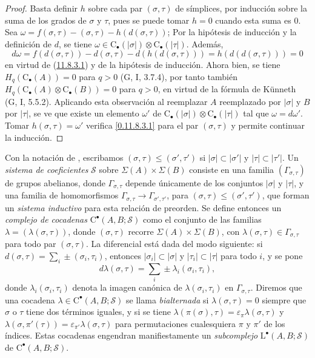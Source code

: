 \begin{proof}
Basta definir $h$ sobre cada par $(\sigma,\tau)$ de símplices, por
inducción sobre la suma de los grados de $\sigma$ y $\tau$, pues se puede tomar $h=0$ cuando esta suma es $0$. Sea
$\omega=f(\sigma,\tau)-(\sigma,\tau)-h(d(\sigma,\tau))$;
Por la hipótesis de inducción y la definición de $d$, se tiene
$\omega\in\mathrm C_\bullet(|\sigma|)\otimes\mathrm C_\bullet(|\tau|)$.
Además,
\[
d\omega=f(d(\sigma,\tau))-d(\sigma,\tau)-d(h(d(\sigma,\tau)))
=h(d(d(\sigma,\tau)))=0
\]
en virtud de (\hyperref[0.11.8.3.1-fr]{11.8.3.1}) y de la hipótesis de inducción. Ahora bien, se tiene $H_q(\mathrm C_\bullet(A))=0$ para $q>0$ (G, I, 3.7.4), por tanto también $H_q(\mathrm C_\bullet(A)\otimes\mathrm C_\bullet(B))=0$ para $q>0$, en virtud de la fórmula de Künneth (G, I, 5.5.2). Aplicando esta observación al reemplazar $A$ reemplazado por $|\sigma|$ y $B$ por
$|\tau|$, se ve que existe un elemento $\omega'$ de $\mathrm C_\bullet(|\sigma|)\otimes\mathrm C_\bullet(|\tau|)$ tal que $\omega=d\omega'$.
Tomar $h(\sigma,\tau)=\omega'$ verifica \eqref{0.11.8.3.1} para el par
$(\sigma,\tau)$ y permite continuar la inducción.
\end{proof}

\begin{env}[11.8.4]
\label{0.11.8.4}
\label{0.11.8.4-fr}
Con la notación de , escribamos
$(\sigma,\tau)\leq(\sigma',\tau')$
si $|\sigma|\subset|\sigma'|$ y $|\tau|\subset|\tau'|$.
Un \emph{sistema de coeficientes} $\mathscr S$ sobre
$\Sigma(A)\times\Sigma(B)$ consiste en una familia
$(\Gamma_{\sigma,\tau})$ de grupos abelianos, donde
$\Gamma_{\sigma,\tau}$ depende únicamente de los conjuntos $|\sigma|$ y
$|\tau|$, y una familia de homomorfismos $\Gamma_{\sigma,\tau}\longrightarrow\Gamma_{\sigma',\tau'}$, para $(\sigma,\tau)\leq(\sigma',\tau')$, que forman un \emph{sistema inductivo} para esta relación de preorden. Se define entonces un \emph{complejo de cocadenas} $\mathrm C^\bullet(A,B;\mathscr S)$ como el conjunto de las familias $\lambda=(\lambda(\sigma,\tau))$, donde $(\sigma,\tau)$ recorre $\Sigma(A)\times\Sigma(B)$, con $\lambda(\sigma,\tau)\in\Gamma_{\sigma,\tau}$ para todo par $(\sigma,\tau)$. La diferencial está dada del modo siguiente: si
$d(\sigma,\tau)=\sum_i\pm(\sigma_i,\tau_i)$,
entonces $|\sigma_i|\subset|\sigma|$ y $|\tau_i|\subset|\tau|$ para todo
$i$, y se pone
\[
d\lambda(\sigma,\tau)=\sum_i\pm\lambda_i(\sigma_i,\tau_i),
\]
donde $\lambda_i(\sigma_i,\tau_i)$ denota la imagen canónica de
$\lambda(\sigma_i,\tau_i)$ en $\Gamma_{\sigma,\tau}$. Diremos que una cocadena $\lambda\in\mathrm C^\bullet(A,B;\mathscr S)$ se llama
\emph{bialternada} si $\lambda(\sigma,\tau)=0$ siempre que $\sigma$
o $\tau$ tiene dos términos iguales, y si se tiene $\lambda(\pi(\sigma),\tau)=\varepsilon_\pi\lambda(\sigma,\tau)$ y $\lambda(\sigma,\pi'(\tau))=\varepsilon_{\pi'}\lambda(\sigma,\tau)$ para permutaciones cualesquiera $\pi$ y $\pi'$ de los índices.
Estas cocadenas engendran manifiestamente un \emph{subcomplejo}
$\mathrm L^\bullet(A,B;\mathscr S)$ de
$\mathrm C^\bullet(A,B;\mathscr S)$.
\end{env}

